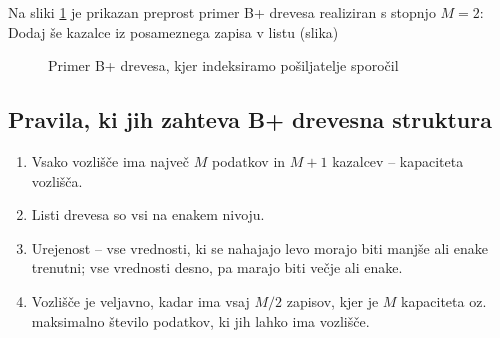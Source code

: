 \documentclass[a4paper,12pt,openright]{book}
\begin{document}
        Na sliki \ref{btree_example} je prikazan preprost primer B+ drevesa realiziran s stopnjo $M=2$:
        \colorbox{BurntOrange}{Dodaj še kazalce iz posameznega zapisa v listu (slika)}
        
        \begin{figure}[h]
        
\begin{center}
\end{center}

            \caption{Primer B+ drevesa, kjer indeksiramo pošiljatelje sporočil}
            \label{btree_example}
        \end{figure}

        

        \newpage
        \subsection{Pravila, ki jih zahteva B+ drevesna struktura}
        \begin{enumerate}
            \item Vsako vozlišče ima največ $M$ podatkov in $M+1$ kazalcev – kapaciteta vozlišča.
            \item Listi drevesa so vsi na enakem nivoju.
            \item Urejenost – vse vrednosti, ki se nahajajo levo morajo biti manjše ali enake trenutni; vse vrednosti desno, pa marajo biti večje ali enake.
            \item Vozlišče je veljavno, kadar ima vsaj $M/2$ zapisov, kjer je $M$ kapaciteta oz. maksimalno število podatkov, ki jih lahko ima vozlišče.
        \end{enumerate}
\end{document}
